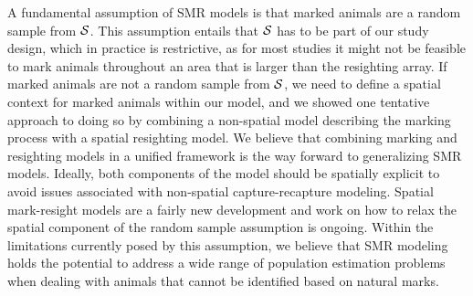 A fundamental assumption of SMR models is that marked animals are a random sample from ${\cal S}$. %
This assumption entails that ${\cal S}$ has to be part of our study design, which in practice is restrictive, as for most studies it might not be feasible to mark animals throughout an area that is larger than the resighting array. If marked animals are not a random sample from ${\cal S}$, we need to define a spatial context for marked animals within our model, and we showed one tentative approach to doing so by combining a non-spatial model describing the marking process with a spatial resighting model. We believe that combining marking and resighting models in a unified framework is the way forward to generalizing SMR models. Ideally, both components of the model should be spatially explicit to avoid issues associated with non-spatial capture-recapture modeling. Spatial mark-resight models are a fairly new development and work on how to relax the spatial component of the random sample assumption is ongoing. Within the limitations currently posed by this assumption, we believe that SMR modeling holds the potential to address a wide range of population estimation problems when dealing with animals that cannot be identified based on natural marks.




